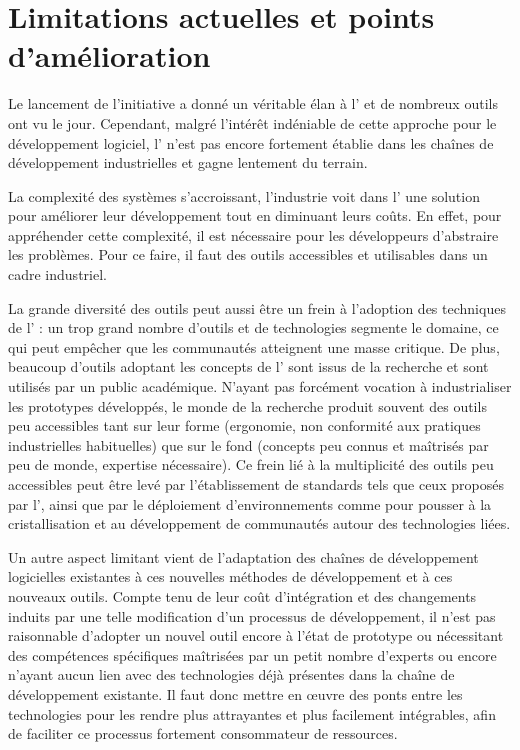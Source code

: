 \section{Limitations actuelles et points d'amélioration}

Le lancement de l'initiative {\mda} a donné un véritable élan à l'{\idm} et de
nombreux outils ont vu le jour. Cependant, malgré l'intérêt indéniable de
cette approche pour le développement logiciel, l'{\idm} n'est pas encore
fortement établie dans les chaînes de développement industrielles et gagne
lentement du terrain.

La complexité des systèmes s'accroissant, l'industrie voit dans l'{\idm} une
solution pour améliorer leur développement tout en diminuant leurs coûts. En
effet, pour appréhender cette complexité, il est nécessaire pour les
développeurs d'abstraire les problèmes. Pour ce faire, il faut des outils
accessibles et utilisables dans un cadre industriel. 

La grande diversité des outils peut aussi être un frein à l'adoption des
techniques de l'{\idm} : un trop grand nombre d'outils et de technologies
segmente le domaine, ce qui peut empêcher que les communautés atteignent une
masse critique. De plus, beaucoup d'outils adoptant les concepts de l'{\idm}
sont issus de la recherche et sont utilisés par un public académique.  N'ayant
pas forcément vocation à industrialiser les prototypes développés, le monde de
la recherche produit souvent des outils peu accessibles tant sur leur forme
(ergonomie, non conformité aux pratiques industrielles habituelles) que sur le
fond (concepts peu connus et maîtrisés par peu de monde, expertise nécessaire).
Ce frein lié à la multiplicité des outils peu accessibles peut être levé par
l'établissement de standards tels que ceux proposés par l'{\omg}, ainsi que par
le déploiement d'environnements comme {\eclipse} pour pousser à la
cristallisation et au développement de communautés autour des technologies
liées. 

Un autre aspect limitant vient de l'adaptation des chaînes de développement
logicielles existantes à ces nouvelles méthodes de développement et à ces
nouveaux outils. Compte tenu de leur coût d'intégration et des
changements induits par une telle modification d'un processus de développement,
il n'est pas raisonnable d'adopter un nouvel outil encore à l'état de prototype
ou nécessitant des compétences spécifiques maîtrisées par un petit nombre 
d'experts ou encore n'ayant aucun lien avec des technologies déjà présentes
dans la chaîne de développement existante. Il faut donc mettre en œuvre des
ponts entre les technologies pour les rendre plus attrayantes et plus
facilement intégrables, afin de faciliter ce processus fortement consommateur
de ressources.

